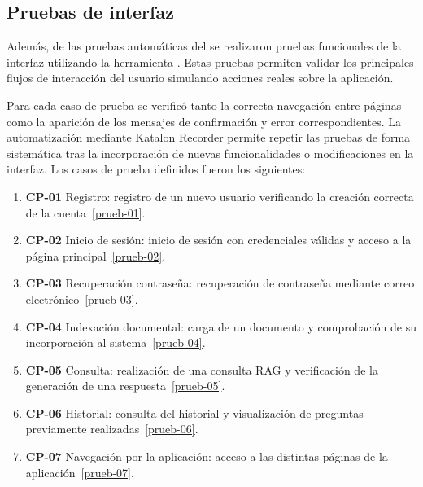 \subsection{Pruebas de interfaz}

Además, de las pruebas automáticas del  se realizaron pruebas funcionales de la interfaz  utilizando la herramienta . Estas pruebas permiten validar los principales flujos de interacción del usuario simulando acciones reales sobre la aplicación.

Para cada caso de prueba se verificó tanto la correcta navegación entre páginas como la aparición de los mensajes de confirmación y error correspondientes. La automatización mediante Katalon Recorder permite repetir las pruebas de forma sistemática tras la incorporación de nuevas funcionalidades o modificaciones en la interfaz. Los casos de prueba definidos fueron los siguientes:
\begin{enumerate}
\tightlist
	\item \textbf{CP-01} Registro: registro de un nuevo usuario verificando la creación correcta de la cuenta~\ref{prueb-01}. 
	\item \textbf{CP-02} Inicio de sesión: inicio de sesión con credenciales válidas y acceso a la página principal~\ref{prueb-02}.
	\item \textbf{CP-03} Recuperación contraseña: recuperación de contraseña mediante correo electrónico~\ref{prueb-03}.
	\item \textbf{CP-04} Indexación documental: carga de un documento y comprobación de su incorporación al sistema~\ref{prueb-04}.
	\item \textbf{CP-05} Consulta: realización de una consulta RAG y verificación de la generación de una respuesta~\ref{prueb-05}.
	\item \textbf{CP-06} Historial: consulta del historial y visualización de preguntas previamente realizadas~\ref{prueb-06}.
	\item \textbf{CP-07} Navegación por la aplicación: acceso a las distintas páginas de la aplicación~\ref{prueb-07}.
\end{enumerate}


